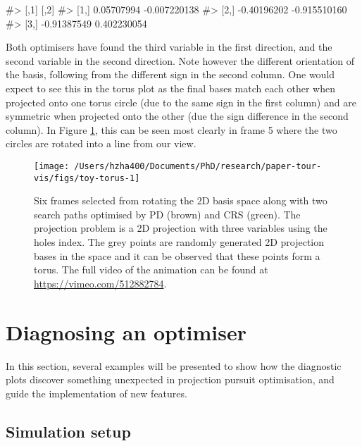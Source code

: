 \begin{Schunk}
\begin{Soutput}
#>             [,1]         [,2]
#> [1,]  0.05707994 -0.007220138
#> [2,] -0.40196202 -0.915510160
#> [3,] -0.91387549  0.402230054
\end{Soutput}
\end{Schunk}

Both optimisers have found the third variable in the first direction,
and the second variable in the second direction. Note however the
different orientation of the basis, following from the different sign in
the second column. One would expect to see this in the torus plot as the
final bases match each other when projected onto one torus circle (due
to the same sign in the first column) and are symmetric when projected
onto the other (due the sign difference in the second column). In Figure
\ref{fig:toy-torus}, this can be seen most clearly in frame 5 where the
two circles are rotated into a line from our view.

\begin{Schunk}
\begin{figure}

{\centering \texttt{[image: /Users/hzha400/Documents/PhD/research/paper-tour-vis/figs/toy-torus-1]} 

}

\caption{Six frames selected from rotating the 2D basis space along with two search paths optimised by PD (brown) and CRS (green). The projection problem is a 2D projection with three variables using the holes index. The grey points are randomly generated 2D projection bases in the space and it can be observed that these points form a torus. The full video of the animation can be found at \url{https://vimeo.com/512882784}.}\label{fig:toy-torus}
\end{figure}
\end{Schunk}

\hypertarget{application}{%
\section{Diagnosing an optimiser}\label{application}}

In this section, several examples will be presented to show how the
diagnostic plots discover something unexpected in projection pursuit
optimisation, and guide the implementation of new features.

\hypertarget{simulation-setup}{%
\subsection{Simulation setup}\label{simulation-setup}}

